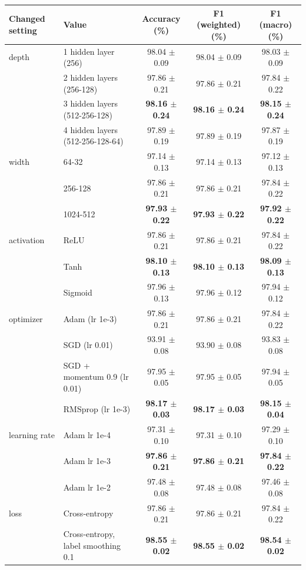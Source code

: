 \begin{tabular}{llccc}
\hline
Changed setting & Value & Accuracy (\%) & F1 (weighted) (\%) & F1 (macro) (\%) \\
\hline
depth & 1 hidden layer (256) & 98.04 $\pm$ 0.09 & 98.04 $\pm$ 0.09 & 98.03 $\pm$ 0.09 \\
 & 2 hidden layers (256-128) & 97.86 $\pm$ 0.21 & 97.86 $\pm$ 0.21 & 97.84 $\pm$ 0.22 \\
 & 3 hidden layers (512-256-128) & \textbf{98.16 $\pm$ 0.24} & \textbf{98.16 $\pm$ 0.24} & \textbf{98.15 $\pm$ 0.24} \\
 & 4 hidden layers (512-256-128-64) & 97.89 $\pm$ 0.19 & 97.89 $\pm$ 0.19 & 97.87 $\pm$ 0.19 \\
\hline
width & 64-32 & 97.14 $\pm$ 0.13 & 97.14 $\pm$ 0.13 & 97.12 $\pm$ 0.13 \\
 & 256-128 & 97.86 $\pm$ 0.21 & 97.86 $\pm$ 0.21 & 97.84 $\pm$ 0.22 \\
 & 1024-512 & \textbf{97.93 $\pm$ 0.22} & \textbf{97.93 $\pm$ 0.22} & \textbf{97.92 $\pm$ 0.22} \\
\hline
activation & ReLU & 97.86 $\pm$ 0.21 & 97.86 $\pm$ 0.21 & 97.84 $\pm$ 0.22 \\
 & Tanh & \textbf{98.10 $\pm$ 0.13} & \textbf{98.10 $\pm$ 0.13} & \textbf{98.09 $\pm$ 0.13} \\
 & Sigmoid & 97.96 $\pm$ 0.13 & 97.96 $\pm$ 0.12 & 97.94 $\pm$ 0.12 \\
\hline
optimizer & Adam (lr 1e-3) & 97.86 $\pm$ 0.21 & 97.86 $\pm$ 0.21 & 97.84 $\pm$ 0.22 \\
 & SGD (lr 0.01) & 93.91 $\pm$ 0.08 & 93.90 $\pm$ 0.08 & 93.83 $\pm$ 0.08 \\
 & SGD + momentum 0.9 (lr 0.01) & 97.95 $\pm$ 0.05 & 97.95 $\pm$ 0.05 & 97.94 $\pm$ 0.05 \\
 & RMSprop (lr 1e-3) & \textbf{98.17 $\pm$ 0.03} & \textbf{98.17 $\pm$ 0.03} & \textbf{98.15 $\pm$ 0.04} \\
\hline
learning rate & Adam lr 1e-4 & 97.31 $\pm$ 0.10 & 97.31 $\pm$ 0.10 & 97.29 $\pm$ 0.10 \\
 & Adam lr 1e-3 & \textbf{97.86 $\pm$ 0.21} & \textbf{97.86 $\pm$ 0.21} & \textbf{97.84 $\pm$ 0.22} \\
 & Adam lr 1e-2 & 97.48 $\pm$ 0.08 & 97.48 $\pm$ 0.08 & 97.46 $\pm$ 0.08 \\
\hline
loss & Cross-entropy & 97.86 $\pm$ 0.21 & 97.86 $\pm$ 0.21 & 97.84 $\pm$ 0.22 \\
 & Cross-entropy, label smoothing 0.1 & \textbf{98.55 $\pm$ 0.02} & \textbf{98.55 $\pm$ 0.02} & \textbf{98.54 $\pm$ 0.02} \\

\end{tabular}
